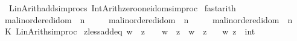 \begin{isabellebody}
\ \ {\isacharhash}{\kern0pt}{\isachargreater}{\kern0pt}\ Lin{\isacharunderscore}{\kern0pt}Arith{\isachardot}{\kern0pt}add{\isacharunderscore}{\kern0pt}simprocs\ {\isacharbrackleft}{\kern0pt}Int{\isacharunderscore}{\kern0pt}Arith{\isachardot}{\kern0pt}zero{\isacharunderscore}{\kern0pt}one{\isacharunderscore}{\kern0pt}idom{\isacharunderscore}{\kern0pt}simproc{\isacharbrackright}{\kern0pt}\isanewline
{\isacharparenright}{\kern0pt}{\isacartoucheclose}\isanewline
\isanewline
{}\isamarkupfalse%
\ fast{\isacharunderscore}{\kern0pt}arith\isanewline
\ \ {\isacharparenleft}{\kern0pt}{\isachardoublequoteopen}{\isacharparenleft}{\kern0pt}m{\isacharcolon}{\kern0pt}{\isacharcolon}{\kern0pt}{\isacharprime}{\kern0pt}a{\isacharcolon}{\kern0pt}{\isacharcolon}{\kern0pt}linordered{\isacharunderscore}{\kern0pt}idom{\isacharparenright}{\kern0pt}\ {\isacharless}{\kern0pt}\ n{\isachardoublequoteclose}\ {\isacharbar}{\kern0pt}\isanewline
\ \ \ \ {\isachardoublequoteopen}{\isacharparenleft}{\kern0pt}m{\isacharcolon}{\kern0pt}{\isacharcolon}{\kern0pt}{\isacharprime}{\kern0pt}a{\isacharcolon}{\kern0pt}{\isacharcolon}{\kern0pt}linordered{\isacharunderscore}{\kern0pt}idom{\isacharparenright}{\kern0pt}\ {\isasymle}\ n{\isachardoublequoteclose}\ {\isacharbar}{\kern0pt}\isanewline
\ \ \ \ {\isachardoublequoteopen}{\isacharparenleft}{\kern0pt}m{\isacharcolon}{\kern0pt}{\isacharcolon}{\kern0pt}{\isacharprime}{\kern0pt}a{\isacharcolon}{\kern0pt}{\isacharcolon}{\kern0pt}linordered{\isacharunderscore}{\kern0pt}idom{\isacharparenright}{\kern0pt}\ {\isacharequal}{\kern0pt}\ n{\isachardoublequoteclose}{\isacharparenright}{\kern0pt}\ {\isacharequal}{\kern0pt}\isanewline
\ \ {\isacartoucheopen}K\ Lin{\isacharunderscore}{\kern0pt}Arith{\isachardot}{\kern0pt}simproc{\isacartoucheclose}%
\endisatagML
{\isafoldML}%
%
\isadelimML
%
\endisadelimML
%
\isadelimdocument
%
\endisadelimdocument
%
\isatagdocument
%
\isamarkuptrue%
%
\endisatagdocument
{\isafolddocument}%
%
\isadelimdocument
%
\endisadelimdocument
{}\isamarkupfalse%
\ zless{\isacharunderscore}{\kern0pt}add{}{\isacharunderscore}{\kern0pt}eq{\isacharcolon}{\kern0pt}\ {\isachardoublequoteopen}w\ {\isacharless}{\kern0pt}\ z\ {\isacharplus}{\kern0pt}\ {}\ {\isasymlongleftrightarrow}\ w\ {\isacharless}{\kern0pt}\ z\ {\isasymor}\ w\ {\isacharequal}{\kern0pt}\ z{\isachardoublequoteclose}\isanewline
\ \ \ w\ z\ {\isacharcolon}{\kern0pt}{\isacharcolon}{\kern0pt}\ int\isanewline
%
\isadelimproof
\ \ %

\end{isabellebody}
